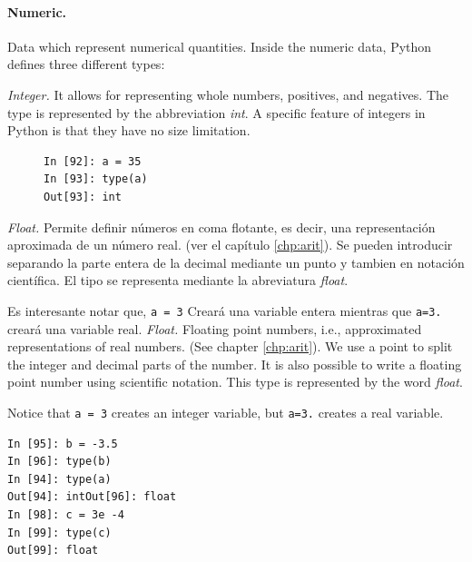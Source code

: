 \begin{paracol}{2}
\paragraph{Numeric.} Data which represent numerical quantities. Inside the numeric data, Python defines three different types:

\emph{Integer.} It allows for representing whole numbers, positives, and negatives. The type is represented by the abbreviation \emph{int}. A specific feature of integers in Python is that they have no size limitation.
\end{paracol}

\begin{figure}[thp]
\centering
\begin{minipage}{0.2\textwidth}
\begin{verbatim}
In [92]: a = 35
In [93]: type(a)
Out[93]: int
\end{verbatim}
\end{minipage}
\end{figure}
\begin{paracol}{2}   
\emph{Float.} Permite definir números en coma flotante, es decir, una representación aproximada de un número real. (ver el capítulo \ref{chp:arit}). Se pueden introducir separando la parte entera de la decimal mediante un punto y tambien en notación científica. El tipo se representa mediante la abreviatura \emph{float}.

Es interesante notar que, \texttt{a = 3} Creará una variable entera mientras que \texttt{a=3.} creará una variable real.
\switchcolumn
\emph{Float.} Floating point numbers, i.e., approximated representations of real numbers. (See chapter \ref{chp:arit}). We use a point to split the integer and decimal parts of the number. It is also possible to write a floating point number using scientific notation. This type is represented by the word \emph{float}.

Notice that \texttt{a = 3} creates an integer variable, but \texttt{a=3.} creates a real variable. 
\end{paracol}

\begin{center}
\begin{minipage}{0.2\textwidth}
\begin{verbatim}
In [95]: b = -3.5
In [96]: type(b)
In [94]: type(a)
Out[94]: intOut[96]: float
In [98]: c = 3e -4
In [99]: type(c)
Out[99]: float
\end{verbatim}
\end{minipage}
\end{center}


